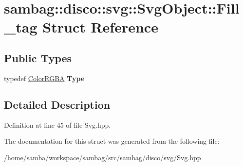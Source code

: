 \hypertarget{structsambag_1_1disco_1_1svg_1_1_svg_object_1_1_fill__tag}{
\section{sambag::disco::svg::SvgObject::Fill\_\-tag Struct Reference}
\label{structsambag_1_1disco_1_1svg_1_1_svg_object_1_1_fill__tag}
}
\subsection*{Public Types}
\begin{DoxyCompactItemize}
\item 
\hypertarget{structsambag_1_1disco_1_1svg_1_1_svg_object_1_1_fill__tag_a66e97b3cad6eaf308ef4e906a0c54366}{
typedef \hyperlink{structsambag_1_1com_1_1_color_r_g_b_a}{ColorRGBA} {\bfseries Type}}
\label{structsambag_1_1disco_1_1svg_1_1_svg_object_1_1_fill__tag_a66e97b3cad6eaf308ef4e906a0c54366}

\end{DoxyCompactItemize}


\subsection{Detailed Description}


Definition at line 45 of file Svg.hpp.



The documentation for this struct was generated from the following file:\begin{DoxyCompactItemize}
\item 
/home/samba/workspace/sambag/src/sambag/disco/svg/Svg.hpp\end{DoxyCompactItemize}
